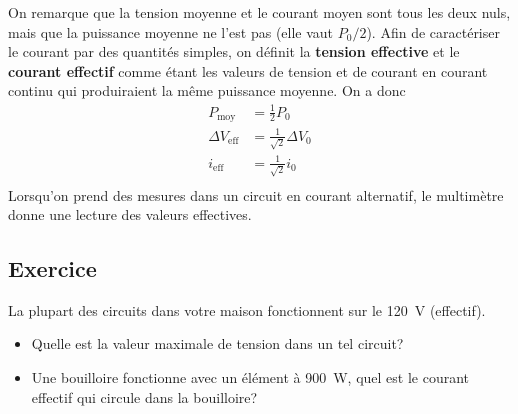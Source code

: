 On remarque que la tension moyenne et le courant moyen sont tous les deux nuls,
mais que la puissance moyenne ne l'est pas (elle vaut $P_0 / 2$). Afin de
caractériser le courant par des quantités simples, on définit la
\textbf{tension effective} et le \textbf{courant effectif} comme étant les
valeurs de tension et de courant en courant continu qui produiraient la même
puissance moyenne. On a donc
\begin{align*}
  P_\mathrm{moy} &= \frac{1}{2} P_0  \\
  \Delta V_\mathrm{eff} &= \frac{1}{\sqrt{2}} \Delta V_0  \\
  i_\mathrm{eff} &= \frac{1}{\sqrt{2}} i_0  \\
\end{align*}
Lorsqu'on prend des mesures dans un circuit en courant alternatif, le
multimètre donne une lecture des valeurs effectives.

\begin{center}
\end{center}

\subsection*{Exercice}


La plupart des circuits dans votre maison fonctionnent sur le \SI{120}{\volt}
(effectif).
\begin{itemize}
  \item Quelle est la valeur maximale de tension dans un tel circuit?
  \item Une bouilloire fonctionne avec un élément à \SI{900}{W}, quel est le
    courant effectif qui circule dans la bouilloire?
\end{itemize}

